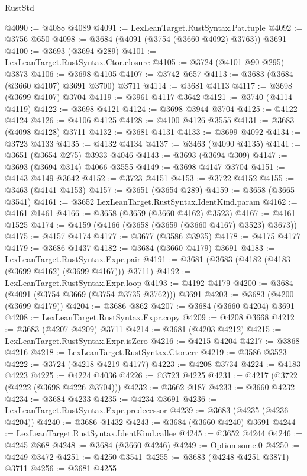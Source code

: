 \begin{lexlean}{RustStd}
\begin{coremodule}
@4090 := @4088 @4089
@4091 := LexLeanTarget.RustSyntax.Pat.tuple
@4092 := @3756 @650
@4098 := @3684 (@4091 (@3754 (@3660 @4092) @3763)) @3691
@4100 := @3693 (@3694 @289)
@4101 := LexLeanTarget.RustSyntax.Ctor.closure
@4105 := @3724 (@4101 @90 @295) @3873
@4106 := @3698 @4105
@4107 := @3742 @657
@4113 := @3683 (@3684 (@3660 @4107) @3691 @3700) @3711
@4114 := @3681 @4113
@4117 := @3698 (@3699 @4107) @3704
@4119 := @3961 @4117 @3642
@4121 := @3740 (@4114 @4119)
@4122 := @3698 @4121
@4124 := @3698 @3944 @3704
@4125 := @4122 @4124
@4126 := @4106 @4125
@4128 := @4100 @4126 @3555
@4131 := @3683 (@4098 @4128) @3711
@4132 := @3681 @4131
@4133 := @3699 @4092
@4134 := @3723 @4133
@4135 := @4132 @4134
@4137 := @3463 (@4090 @4135)
@4141 := @3651 (@3654 @275) @3933 @4046
@4143 := @3693 (@3694 @309)
@4147 := @3693 (@3694 @314) @4066 @3555
@4149 := @3698 @4147 @3704
@4151 := @4143 @4149 @3642
@4152 := @3723 @4151
@4153 := @3722 @4152
@4155 := @3463 (@4141 @4153)
@4157 := @3651 (@3654 @289)
@4159 := @3658 (@3665 @3541)
@4161 := @3652 LexLeanTarget.RustSyntax.IdentKind.param
@4162 := @4161 @1461
@4166 := @3658 (@3659 (@3660 @4162) @3523)
@4167 := @4161 @1525
@4174 := @4159 (@4166 (@3658 (@3659 (@3660 @4167) @3523) @3673))
@4175 := @4157 @4174
@4177 := @3677 (@3586 @3935)
@4178 := @4175 @4177
@4179 := @3686 @1437
@4182 := @3684 (@3660 @4179) @3691
@4183 := LexLeanTarget.RustSyntax.Expr.pair
@4191 := @3681 (@3683 (@4182 (@4183 (@3699 @4162) (@3699 @4167))) @3711)
@4192 := LexLeanTarget.RustSyntax.Expr.loop
@4193 := @4192 @4179
@4200 := @3684 (@4091 (@3754 @3669 (@3754 @3735 @3762))) @3691
@4203 := @3683 (@4200 (@3699 @4179))
@4204 := @3686 @862
@4207 := @3684 (@3660 @4204) @3691
@4208 := LexLeanTarget.RustSyntax.Expr.copy
@4209 := @4208 @3668
@4212 := @3683 (@4207 @4209) @3711
@4214 := @3681 (@4203 @4212)
@4215 := LexLeanTarget.RustSyntax.Expr.isZero
@4216 := @4215 @4204
@4217 := @3868 @4216
@4218 := LexLeanTarget.RustSyntax.Ctor.err
@4219 := @3586 @3523
@4222 := @3724 (@4218 @4219 @4177)
@4223 := @4208 @3734
@4224 := @4183 @4223
@4225 := @4224 @4036
@4226 := @3723 @4225
@4231 := @4217 (@3722 (@4222 (@3698 @4226 @3704)))
@4232 := @3662 @187
@4233 := @3660 @4232
@4234 := @3684 @4233
@4235 := @4234 @3691
@4236 := LexLeanTarget.RustSyntax.Expr.predecessor
@4239 := @3683 (@4235 (@4236 @4204))
@4240 := @3686 @1432
@4243 := @3684 (@3660 @4240) @3691
@4244 := LexLeanTarget.RustSyntax.IdentKind.callee
@4245 := @3652 @4244
@4246 := @4245 @868
@4248 := @3684 (@3660 @4246)
@4249 := Option.some.{0}
@4250 := @4249 @3472
@4251 := @4250 @3541
@4255 := @3683 (@4248 @4251 @3871) @3711
@4256 := @3681 @4255

\end{coremodule}
\end{lexlean}
